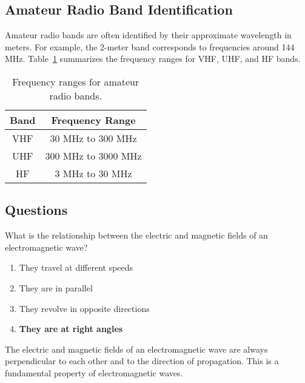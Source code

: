 \subsection*{Amateur Radio Band Identification}
Amateur radio bands are often identified by their approximate wavelength in meters. For example, the 2-meter band corresponds to frequencies around 144 MHz. Table~\ref{tab:frequency_ranges} summarizes the frequency ranges for VHF, UHF, and HF bands.

\begin{table}[h!]
    \centering
    \begin{tabular}{|c|c|}
        \hline
        \textbf{Band} & \textbf{Frequency Range} \\
        \hline
        VHF & 30 MHz to 300 MHz \\
        UHF & 300 MHz to 3000 MHz \\
        HF & 3 MHz to 30 MHz \\
        \hline
    \end{tabular}
    \caption{Frequency ranges for amateur radio bands.}
    \label{tab:frequency_ranges}
\end{table}

\subsection*{Questions}
\begin{tcolorbox}[colback=gray!10!white,colframe=black!75!black,title={T3B01}]
    What is the relationship between the electric and magnetic fields of an electromagnetic wave?
    \begin{enumerate}[label=\Alph*),noitemsep]
        \item They travel at different speeds
        \item They are in parallel
        \item They revolve in opposite directions
        \item \textbf{They are at right angles}
    \end{enumerate}
\end{tcolorbox}
The electric and magnetic fields of an electromagnetic wave are always perpendicular to each other and to the direction of propagation. This is a fundamental property of electromagnetic waves.



